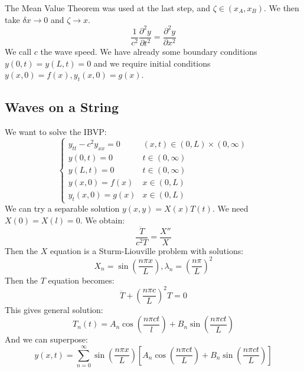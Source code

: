 \documentclass[../Main.tex]{subfiles}
\begin{document}
The Mean Value Theorem was used at the last step, and $\zeta \in (x_A, x_B)$. We then take $\delta x \to 0$ and $\zeta \to x$.
\begin{equation}
    \frac{1}{c^2} \frac{\partial^{2}y}{\partial t^{2}} = \frac{\partial^{2}y}{\partial x^{2}}
    \label{eqnWave}
\end{equation}
We call $c$ the wave speed. We have already some boundary conditions $y(0, t) = y(L, t) = 0$ and we require initial conditions $y(x, 0) = f(x), y_t(x, 0) = g(x)$.
\subsection{Waves on a String}
We want to solve the IBVP:
\begin{equation*}
    \begin{cases}
        y_{tt} - c^2y_{xx} = 0 & (x, t) \in (0, L) \times (0, \infty) \\
        y(0, t) = 0 & t \in (0, \infty) \\
        y(L, t) = 0 & t \in (0, \infty) \\
        y(x, 0) = f(x) & x \in (0, L) \\
        y_t(x, 0) = g(x) & x \in (0, L)
    \end{cases}
\end{equation*}
We can try a separable solution $y(x, y) = X(x) T(t)$. We need $X(0) = X(l) = 0$. We obtain:
\begin{equation}
    \frac{\ddot{T}}{c^2T} = \frac{X''}{X}
    \label{eqnWaveSeparated}
\end{equation}
Then the $X$ equation is a Sturm-Liouville problem with solutions:
\begin{equation*}
    X_n = \sin\left(\frac{n\pi x}{L}\right), \lambda_n = \left(\frac{n\pi}{L}\right)^2
\end{equation*}
Then the $T$ equation becomes:
\begin{equation*}
    \ddot{T} + \left(\frac{n\pi c}{L}\right)^2 T = 0
\end{equation*}
This gives general solution:
\begin{equation*}
    T_n(t) = A_n \cos\left(\frac{n\pi c t}{l}\right) + B_n \sin\left(\frac{n\pi c t}{L}\right)
\end{equation*}
And we can superpose:
\begin{equation}
    y(x, t) = \sum_{n=0}^{\infty} \sin\left(\frac{n\pi x}{L}\right)\left[A_n \cos\left(\frac{n\pi c t}{L}\right) + B_n \sin\left(\frac{n \pi c t}{L}\right)\right]
    \label{eqnWaveSolution}
\end{equation}
\end{document}
